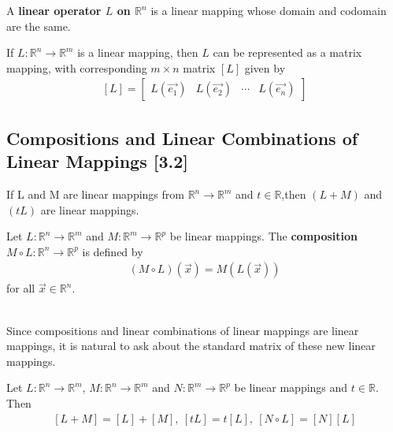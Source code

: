 \documentclass[a4paper,9pt]{extarticle}
\begin{document}
\begin{multicols*}{2}
A \textbf{linear operator $L$ on $\mathbb{R}^n$} is a linear mapping whose domain and codomain are the same.

If $L: \mathbb{R}^n \to \mathbb{R}^m$ is a linear mapping, then $L$ can be represented as a matrix mapping, with corresponding $m \times n$ matrix $[L]$ given by
\begin{equation} \label{3.2-2}
    \begin{split}
        [L] = \begin{bmatrix}L(\vec{e_1}) & L(\vec{e_2}) & \cdots & L(\vec{e_n}) \end{bmatrix}
    \end{split}
\end{equation}


\subsection{Compositions and Linear Combinations
of Linear Mappings [3.2]}
If L and M are linear mappings from $\mathbb{R}^n \to \mathbb{R}^m$ and $t \in \mathbb{R}$,then $(L + M)$ and $(t L)$ are linear mappings.

Let $L: \mathbb{R}^n \to \mathbb{R}^m$ and $M: \mathbb{R}^m \to \mathbb{R}^p$ be linear mappings. The \textbf{composition} $M \circ L: \mathbb{R}^n \to \mathbb{R}^p$ is defined by 
\begin{equation} \label{3.2-3}
    \begin{split}
        (M \circ L)(\vec{x}) = M(L(\vec{x}))
    \end{split}
\end{equation}
for all $\vec{x} \in \mathbb{R}^n$.

\noindent \\ Since compositions and linear combinations of linear mappings are linear mappings, it is natural to ask about the standard matrix of these new linear mappings.

Let $L: \mathbb{R}^n \to \mathbb{R}^m$, $M: \mathbb{R}^n \to \mathbb{R}^m$ and $N: \mathbb{R}^m \to \mathbb{R}^p$ be linear mappings and $t \in \mathbb{R}$. Then
\begin{equation} \label{3.2-4}
    \begin{split}
        [L + M] = [L] + [M], \> [t L] = t[L], \> [N \circ L] = [N][L]
    \end{split}
\end{equation}



\end{multicols*}
\end{document}
